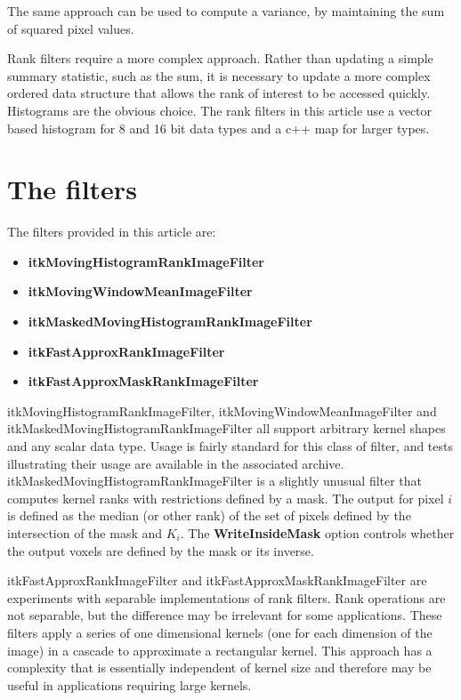 \documentclass{InsightArticle}
\begin{document}
The same approach can be used to compute a variance, by maintaining
the sum of squared pixel values.

Rank filters require a more complex approach. Rather than updating a
simple summary statistic, such as the sum, it is necessary to update a
more complex ordered data structure that allows the rank of interest
to be accessed quickly. Histograms are the obvious choice. The rank
filters in this article use a vector based histogram for 8 and 16 bit
data types and a c++ map for larger types.

\section{The filters}
The filters provided in this article are:
\begin{itemize}
\item {\bf itkMovingHistogramRankImageFilter}
\item {\bf itkMovingWindowMeanImageFilter}
\item {\bf itkMaskedMovingHistogramRankImageFilter}
\item {\bf itkFastApproxRankImageFilter}
\item {\bf itkFastApproxMaskRankImageFilter}
\end{itemize}

itkMovingHistogramRankImageFilter, itkMovingWindowMeanImageFilter and
itkMaskedMovingHistogramRankImageFilter all support arbitrary kernel
shapes and any scalar data type. Usage is fairly standard for this
class of filter, and tests illustrating their usage are available in
the associated archive. itkMaskedMovingHistogramRankImageFilter is a
slightly unusual filter that computes kernel ranks with restrictions
defined by a mask. The output for pixel $i$ is defined as the median
(or other rank) of the set of pixels defined by the intersection of
the mask and $K_i$. The {\bf WriteInsideMask} option controls whether
the output voxels are defined by the mask or its inverse.

itkFastApproxRankImageFilter and itkFastApproxMaskRankImageFilter are
experiments with separable implementations of rank filters. Rank
operations are not separable, but the difference may be irrelevant for
some applications. These filters apply a series of one dimensional
kernels (one for each dimension of the image) in a cascade to
approximate a rectangular kernel. This approach has a complexity that
is essentially independent of kernel size and therefore may be useful
in applications requiring large kernels.
\end{document}
